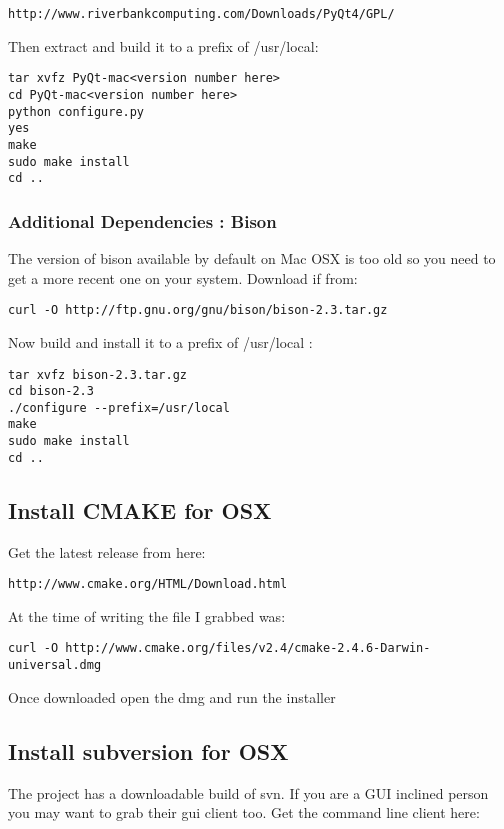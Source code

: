 \begin{verbatim}
http://www.riverbankcomputing.com/Downloads/PyQt4/GPL/
\end{verbatim}

Then extract and build it to a prefix of /usr/local:

\begin{verbatim}
tar xvfz PyQt-mac<version number here>
cd PyQt-mac<version number here>
python configure.py 
yes 
make 
sudo make install 
cd ..  
\end{verbatim}

\subsubsection{Additional Dependencies : Bison}
The version of bison available by default on Mac OSX is too old so you need to
get a more recent one on your system. Download if from:

\begin{verbatim}
curl -O http://ftp.gnu.org/gnu/bison/bison-2.3.tar.gz 
\end{verbatim}

Now build and install it to a prefix of /usr/local :

\begin{verbatim}
tar xvfz bison-2.3.tar.gz 
cd bison-2.3 
./configure --prefix=/usr/local 
make
sudo make install 
cd ..  
\end{verbatim}

\subsection{Install CMAKE for OSX}
Get the latest release from here:

\begin{verbatim}
http://www.cmake.org/HTML/Download.html 
\end{verbatim}

At the time of writing the file I grabbed was:

\begin{verbatim}
curl -O http://www.cmake.org/files/v2.4/cmake-2.4.6-Darwin-universal.dmg
\end{verbatim}

Once downloaded open the dmg and run the installer

\subsection{Install subversion for OSX}
The  project has a downloadable
build of svn. If you are a GUI inclined person you may want to grab their gui
client too. Get the command line client here:


